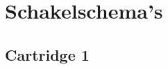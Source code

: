 \chapter{Schakelschema's}
\chapterpreamble

\section{Cartridge 1}
\label{sec:schematic-cartridge1}
\noindent{}

\newpage
